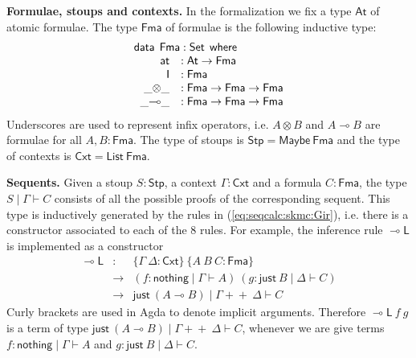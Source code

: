 \documentclass[sn-mathphys-num]{sn-jnl}%
\newcommand{\GG}{\Gamma}
\newcommand{\GD}{\Delta}
\newcommand{\vd}{\vdash}
\newcommand{\ot}{\otimes}
\newcommand{\lolli}{\multimap}
\newcommand{\lleft}{{\lolli}\mathsf{L}}
\newcommand{\unit}{\mathsf{I}}
\newcommand{\List}{\mathsf{List}}
\newcommand{\Maybe}{\mathsf{Maybe}}
\newcommand{\nothing}{\mathsf{nothing}}
\newcommand{\just}{\mathsf{just}}
\newcommand{\append}{+\!\!+}
\newcommand{\At}{\mathsf{At}}
\newcommand{\at}{\mathsf{at}}
\newcommand{\Fma}{\mathsf{Fma}}
\newcommand{\data}{\mathsf{data}}
\newcommand{\where}{\mathsf{where}}
\newcommand{\Set}{\mathsf{Set}}
\newcommand{\Stp}{\mathsf{Stp}}
\newcommand{\Cxt}{\mathsf{Cxt}}
\theoremstyle{thmstyleone}%
\theoremstyle{thmstyletwo}%
\theoremstyle{thmstylethree}%
\begin{document}
\noindent\textbf{Formulae, stoups and contexts.} In the formalization we fix a type $\At$ of atomic formulae.
The type $\Fma$ of formulae is the following inductive type:
\[
\begin{array}{rl}
  \multicolumn{2}{l}{\data \:\:  \Fma : \Set \:\: \where} \\
  \;\; \at &: \At \to \Fma \\
  \;\; \unit &: \Fma \\
  \;\; \_{\ot}\_ &: \Fma \to \Fma \to \Fma \\
  \;\; \_{\lolli}\_ &: \Fma \to \Fma \to \Fma  
\end{array}
\]
Underscores are used to represent infix operators, i.e. $A \ot B$ and $A \lolli B$ are formulae for all $A,B : \Fma$.
The type of stoups is $\Stp = \Maybe ~\Fma$ and the type of contexts is $\Cxt = \List ~\Fma$.

\noindent\textbf{Sequents.} %
Given a stoup $S : \Stp$, a context $\Gamma : \Cxt$ and a formula $C : \Fma$, the type $S \mid \Gamma \vdash C$ consists of all the possible proofs of the corresponding sequent.
This type is inductively generated by the rules in (\ref{eq:seqcalc:skmc:Gir}), i.e. there is a constructor associated to each of the 8 rules.
For example, the inference rule $\lleft$ is implemented as a constructor
\[
\begin{array}{rcl}
\lleft & : & \{\Gamma ~ \Delta : \Cxt \} ~ \{A ~ B ~ C : \Fma\} \\
&\to&(f : \nothing \mid \GG \vd A) ~ (g : \just ~B \mid \GD \vd C) \\
&\to& \just ~(A \lolli B) \mid \GG \append ~\GD \vd C
\end{array}
\]
Curly brackets are used in Agda to denote implicit arguments. Therefore $\lleft ~f ~g$ is a term of type $\just ~(A \lolli B) \mid \GG \append~ \GD \vd C$, whenever we are give terms $f : \nothing \mid \GG \vd A$ and $g : \just ~B \mid \GD \vd C$. 
\end{document}
